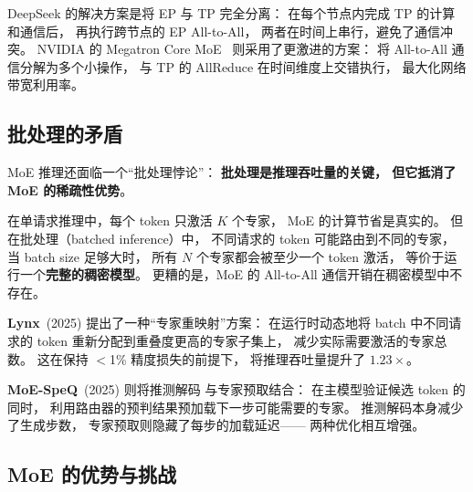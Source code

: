 DeepSeek 的解决方案是将 EP 与 TP 完全分离：
在每个节点内完成 TP 的计算和通信后，
再执行跨节点的 EP All-to-All，
两者在时间上串行，避免了通信冲突。
NVIDIA 的 Megatron Core MoE~\cite{yan2026megatronmoe}
则采用了更激进的方案：
将 All-to-All 通信分解为多个小操作，
与 TP 的 AllReduce 在时间维度上交错执行，
最大化网络带宽利用率。

\subsection{批处理的矛盾}

MoE 推理还面临一个“批处理悖论”：
\textbf{批处理是推理吞吐量的关键，
但它抵消了 MoE 的稀疏性优势}。

在单请求推理中，每个 token 只激活 $K$ 个专家，
MoE 的计算节省是真实的。
但在批处理（batched inference）中，
不同请求的 token 可能路由到不同的专家，
当 batch size 足够大时，
所有 $N$ 个专家都会被至少一个 token 激活，
等价于运行一个\textbf{完整的稠密模型}。
更糟的是，MoE 的 All-to-All 通信开销在稠密模型中不存在。

\textbf{Lynx}~(2025) 提出了一种“专家重映射”方案：%
在运行时动态地将 batch 中不同请求的 token
重新分配到重叠度更高的专家子集上，
减少实际需要激活的专家总数。
这在保持 $<$1\% 精度损失的前提下，
将推理吞吐量提升了 $1.23\times$。

\textbf{MoE-SpeQ}~(2025) 则将推测解码%
与专家预取结合：
在主模型验证候选 token 的同时，
利用路由器的预判结果预加载下一步可能需要的专家。
推测解码本身减少了生成步数，
专家预取则隐藏了每步的加载延迟——
两种优化相互增强。

\subsection{MoE 的优势与挑战}

